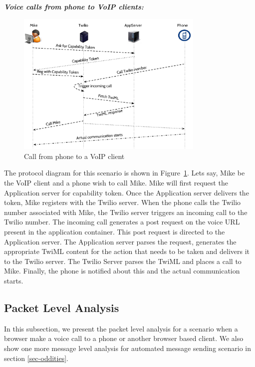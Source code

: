 \emph{\textbf{Voice calls from phone to VoIP clients:} }
\begin{figure}[t!] 
\centering
  \includegraphics[width=0.8\textwidth]{figs/p2c.pdf}
\caption{Call from phone to a VoIP client}
\label{fig:callfromphone}
\end{figure}
The protocol diagram for this scenario is shown in Figure~\ref{fig:callfromphone}. Lets say, Mike be the VoIP client and a phone wish to call Mike. Mike will first request the Application server for capability token. Once the Application server delivers the token, Mike registers with the Twilio server. When the phone calls the Twilio number associated with Mike, the Twilio server triggers an incoming call to the Twilio number. The incoming call generates a post request on the voice URL present in the application container. This post request is directed to the Application server. The Application server parses the request, generates the appropriate TwiML content for the action that needs to be taken and delivers it to the Twilio server. The Twilio Server parses the TwiML and places a call to Mike. Finally, the phone is notified about this and the actual communication starts.

\subsection{Packet Level Analysis}
In this subsection, we present the packet level analysis for a scenario when a browser make a voice call to a phone or another browser based client. We also show one more message level analysis for automated message sending scenario in section \ref{sec-oddities}. 

